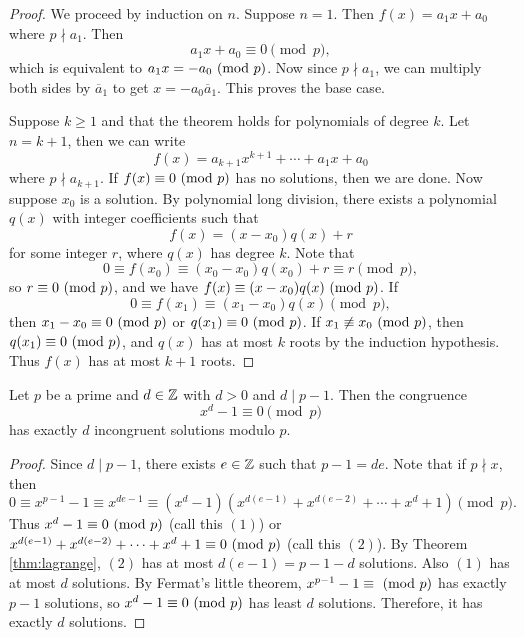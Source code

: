\begin{proof}
  We proceed by induction on $n$. Suppose
  $n = 1$. Then $f(x) = a_1 x + a_0$
  where $p \nmid a_1$. Then
  \[
    a_1 x + a_0 \equiv 0 \pmod{p},
  \]
  which is equivalent to
  $a_1 x = -a_0 \ (\mathrm{mod}\ p)$. Now since
  $p \nmid a_1$, we can multiply both
  sides by $\overline{a}_1$ to get
  $x = -a_0 \overline{a}_1$.
  This proves the base case.

  Suppose $k \ge 1$ and that the theorem
  holds for polynomials of degree
  $k$. Let $n = k + 1$, then we can write
  \[
    f(x) = a_{k + 1} x^{k + 1} + \cdots + a_1 x + a_0
  \]
  where $p \nmid a_{k + 1}$. If
  $f(x) \equiv 0 \ (\mathrm{mod}\ p)$ has no solutions,
  then we are done. Now suppose $x_0$ is a
  solution. By polynomial long division,
  there exists a polynomial $q(x)$ with
  integer coefficients such that
  \[
    f(x) = (x - x_0) q(x) + r
  \]
  for some integer $r$, where $q(x)$
  has degree $k$. Note that
  \[
    0 \equiv f(x_0) \equiv (x_0 - x_0) q(x_0) + r
    \equiv r \pmod{p},
  \]
  so $r \equiv 0 \ (\mathrm{mod}\ p)$, and we have
  $f(x) \equiv (x - x_0) q(x) \ (\mathrm{mod}\ p)$. If
  \[
    0 \equiv f(x_1) \equiv (x_1 - x_0) q(x)
    \pmod{p},
  \]
  then $x_1 - x_0 \equiv 0 \ (\mathrm{mod}\ p)$
  or $q(x_1) \equiv 0 \ (\mathrm{mod}\ p)$.
  If $x_1 \not\equiv x_0 \ (\mathrm{mod}\ p)$,
  then $q(x_1) \equiv 0 \ (\mathrm{mod}\ p)$, and
  $q(x)$ has at most $k$ roots by the
  induction hypothesis. Thus
  $f(x)$ has at most $k + 1$ roots.
\end{proof}

\begin{prop}\label{prop:d-roots-mod-p}
  Let $p$ be a prime and $d \in \mathbb{Z}$ with
  $d > 0$ and $d \mid p - 1$. Then the
  congruence
  \[
    x^d - 1 \equiv 0 \pmod{p}
  \]
  has exactly $d$ incongruent solutions
  modulo $p$.
\end{prop}

\begin{proof}
  Since $d \mid p - 1$, there exists
  $e \in \mathbb{Z}$ such that $p - 1 = de$.
  Note that if $p \nmid x$, then
  \[
    0 \equiv x^{p - 1} - 1
    \equiv x^{de - 1}
    \equiv (x^d - 1)(x^{d(e - 1)} + x^{d(e - 2)} + \cdots + x^d + 1)
    \pmod{p}.
  \]
  Thus $x^d - 1 \equiv 0 \ (\mathrm{mod}\ p)$
  (call this $(1)$) or
  $x^{d(e - 1)} + x^{d(e - 2)} + \cdots + x^d + 1 \equiv 0 \ (\mathrm{mod}\ p)$
  (call this $(2)$). By
  Theorem \ref{thm:lagrange},
  $(2)$ has at most $d(e - 1) = p - 1 - d$
  solutions. Also $(1)$ has at most $d$
  solutions. By Fermat's little theorem,
  $x^{p - 1} - 1 \equiv \ (\mathrm{mod}\ p)$
  has exactly $p - 1$ solutions, so
  $x^d - 1 \equiv 0 \ (\mathrm{mod}\ p)$ has least
  $d$ solutions. Therefore, it has
  exactly $d$ solutions.
\end{proof}

